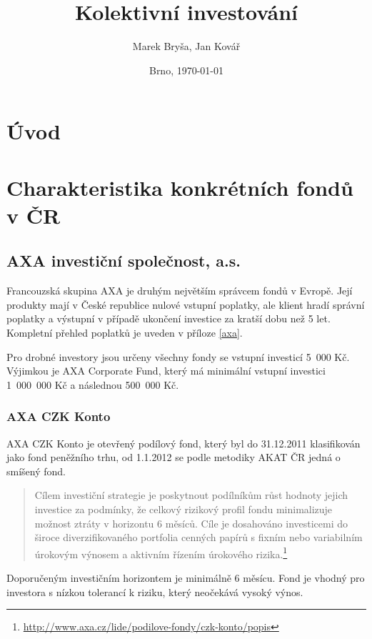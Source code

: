 \documentclass[a4paper,12pt]{article}
\title{Kolektivní investování}
\author{Marek Bryša, Jan Kovář}
\date{Brno, \today}
\begin{document}
\maketitle

\section{Úvod}

\section{Charakteristika konkrétních fondů v ČR}
	\subsection{AXA investiční společnost, a.s.}
		Francouzská skupina AXA je druhým největším správcem fondů v Evropě.\cite{axa_about} Její produkty mají v České republice nulové vstupní poplatky, ale klient hradí správní poplatky a výstupní v případě ukončení investice za kratší dobu než 5 let. Kompletní přehled poplatků je uveden v příloze \ref{axa}.
		
		Pro drobné investory jsou určeny všechny fondy se vstupní investicí 5~000 Kč. Výjimkou je AXA Corporate Fund, který má minimální vstupní investici 1~000~000 Kč a následnou 500~000 Kč.
		
		\subsubsection{AXA CZK Konto}
			AXA CZK Konto je otevřený podílový fond, který byl do 31.12.2011 klasifikován jako fond peněžního trhu, od 1.1.2012 se podle metodiky AKAT ČR jedná o smíšený fond.
			\begin{quote}
				Cílem investiční strategie je poskytnout podílníkům růst hodnoty jejich investice za podmínky, že celkový rizikový profil fondu minimalizuje možnost ztráty v horizontu 6 měsíců. Cíle je dosahováno investicemi do široce diverzifikovaného portfolia cenných papírů s fixním nebo variabilním úrokovým výnosem a aktivním řízením úrokového rizika.\footnote{\url{http://www.axa.cz/lide/podilove-fondy/czk-konto/popis}}
			\end{quote}
			
			Doporučeným investičním horizontem je minimálně 6 měsícu. Fond je vhodný pro investora s nízkou tolerancí k riziku, který neočekává vysoký výnos.
			
\end{document}
